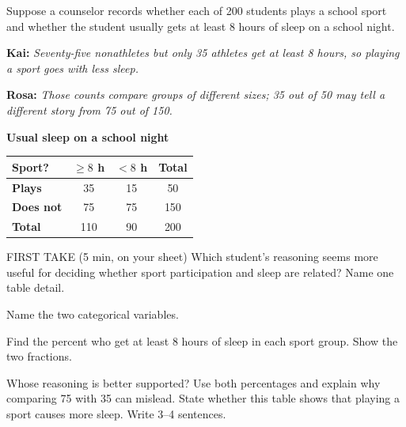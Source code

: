 \documentclass[14pt]{extarticle}
\begin{document}
\pagestyle{empty}


\noindent\begin{minipage}[t]{0.57\linewidth}
\vspace{0pt}
Suppose a counselor records whether each of 200 students plays a school sport and whether the student usually gets at least 8 hours of sleep on a school night.\par\smallskip \textbf{Kai:} \emph{Seventy-five nonathletes but only 35 athletes get at least 8 hours, so playing a sport goes with less sleep.}\par \textbf{Rosa:} \emph{Those counts compare groups of different sizes; 35 out of 50 may tell a different story from 75 out of 150.}\par
\end{minipage}\hfill
\begin{minipage}[t]{0.40\linewidth}
\vspace{0pt}
\begin{center}
\textbf{Usual sleep on a school night}\par\smallskip
\begin{tabular}{|l|c|c|c|}
\hline
\textbf{Sport?} & \textbf{$\geq 8$ h} & \textbf{$<8$ h} & \textbf{Total} \\ \hline
\textbf{Plays} & 35 & 15 & 50 \\ \hline
\textbf{Does not} & 75 & 75 & 150 \\ \hline
\textbf{Total} & 110 & 90 & 200 \\ \hline
\end{tabular}
\end{center}
\end{minipage}

\begin{firsttakebox}{FIRST TAKE (5 min, on your sheet)}
Which student's reasoning seems more useful for deciding whether sport participation and sleep are related? Name one table detail.
\end{firsttakebox}

\begin{description}[leftmargin=1.15in, labelwidth=1in, itemsep=2pt, topsep=2pt]
  \item[\dokbadge{1}~(a)] Name the two categorical variables.
  \item[\dokbadge{2}~(b)] Find the percent who get at least 8 hours of sleep in each sport group. Show the two fractions.
  \item[\dokbadge{3}~(c)] Whose reasoning is better supported? Use both percentages and explain why comparing 75 with 35 can mislead. State whether this table shows that playing a sport causes more sleep. Write 3--4 sentences.
\end{description}
\end{document}
